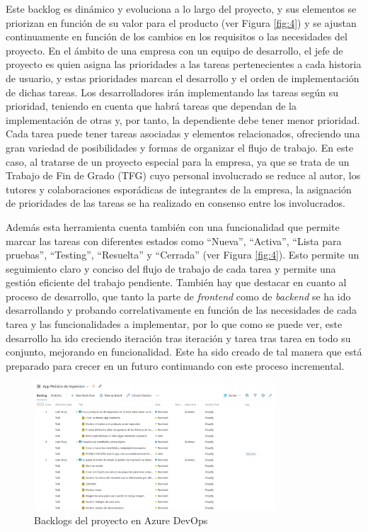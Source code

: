 \documentclass[12pt]{article}
\begin{document}
Este backlog es dinámico y evoluciona a lo largo del proyecto, y sus elementos se priorizan en función de su valor para el 
producto (ver Figura \ref{fig:4}) y se ajustan continuamente en función de los cambios en los requisitos o las necesidades del proyecto. En el ámbito de una empresa con
un equipo de desarrollo, el jefe de proyecto es quien asigna las prioridades a las tareas pertenecientes a cada historia de usuario, y estas prioridades marcan
el desarrollo y el orden de implementación de dichas tareas. Los desarrolladores irán implementando las tareas según su prioridad, 
teniendo en cuenta que habrá tareas que dependan de la implementación de otras y, por tanto, la dependiente debe tener menor prioridad.
Cada tarea puede tener tareas asociadas y elementos relacionados, ofreciendo una gran variedad de posibilidades y formas de organizar el flujo de trabajo. 
En este caso, al tratarse de un proyecto especial para la empresa, ya que se trata de un Trabajo de Fin de Grado (TFG) 
cuyo personal involucrado se reduce al autor, los tutores y colaboraciones esporádicas de integrantes de la empresa, la asignación de prioridades 
de las tareas se ha realizado en consenso entre los involucrados.

Además esta herramienta cuenta también con una funcionalidad que permite marcar las tareas con diferentes estados como ``Nueva'', ``Activa'', ``Lista para pruebas'', ``Testing'', ``Resuelta'' y ``Cerrada'' (ver Figura \ref{fig:4}). Esto permite un seguimiento claro y conciso del flujo de trabajo de cada tarea
y permite una gestión eficiente del trabajo pendiente. También hay que destacar en cuanto al proceso de desarrollo, que tanto la parte de \textit{frontend} como de \textit{backend} se ha ido desarrollando y probando correlativamente en función de las necesidades de cada tarea y las funcionalidades a implementar, por lo que como se puede ver, 
este desarrollo ha ido creciendo iteración tras iteración y tarea tras tarea en todo su conjunto, mejorando en funcionalidad. Este ha sido creado de tal manera que está preparado para crecer en un futuro continuando con este proceso incremental.

\begin{figure}[ht]
    \centering
    \includegraphics[width=0.8\textwidth]{imagenes/Backlogs de Devops.png}
    \caption{\label{fig:3}Backlogs del proyecto en Azure DevOps}
    \vspace{\fill}
\end{figure}
\end{document}
